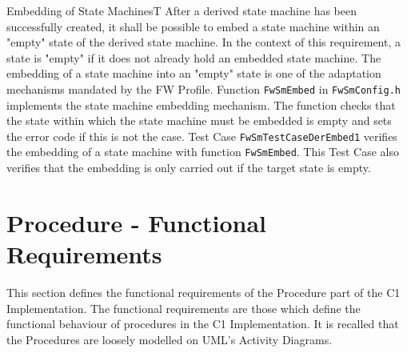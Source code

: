\documentclass[a4paper,10pt]{article}
\let\stdsection\section
\renewcommand\section{\newpage\stdsection}
\newenvironment{fw_req_note}[7]
{\addtocounter{subsubsection}{1}
	\hspace{0.2cm}\textbf{FW-\arabic{section}.\arabic{subsection}.\arabic{subsubsection}/#2
	\hspace{0.8cm} #1}
	\vspace{-10pt}
\begin{longtable}{p{2.7cm}P{8.5cm}}
\hline
\textsc{Requirement} & #3 \\
\textsc{Note} & #4 \\
\textsc{Justification} & #5 \\
\textsc{Implementation} & #6  \\ 
\textsc{Verification} & #7  \\
\hline
}
{\end{longtable}}
\begin{document}
\begin{fw_req_note}{Embedding of State Machines}{T}
{After a derived state machine has been successfully created, it shall 
be possible to embed a state machine within an "empty" state of the derived state machine.}
{In the context of this requirement, a state is "empty" if it does not already 
hold an embedded state machine.}
{The embedding of a state machine into an "empty" state is one of the 
adaptation mechanisms mandated by the FW Profile.}
{ Function \texttt{FwSmEmbed} in \texttt{FwSmConfig.h} implements the 
state machine embedding mechanism. 
The function checks that the state within which the state machine must be embedded is empty 
and sets the error code if this is not the case.} 
{Test Case \texttt{FwSmTestCaseDerEmbed1} verifies the embedding of a 
state machine with function \texttt{FwSmEmbed}. 
This Test Case also verifies that the embedding is only carried out if the target state is empty.}
\end{fw_req_note}



\section{Procedure - Functional Requirements}\label{sec:prFncReqs}

This section defines the functional requirements of the Procedure part of the C1 Implementation. 
The functional requirements are those which define the functional behaviour of procedures in the C1 Implementation.
It is recalled that the Procedures are loosely modelled on UML's Activity Diagrams.
\end{document}

